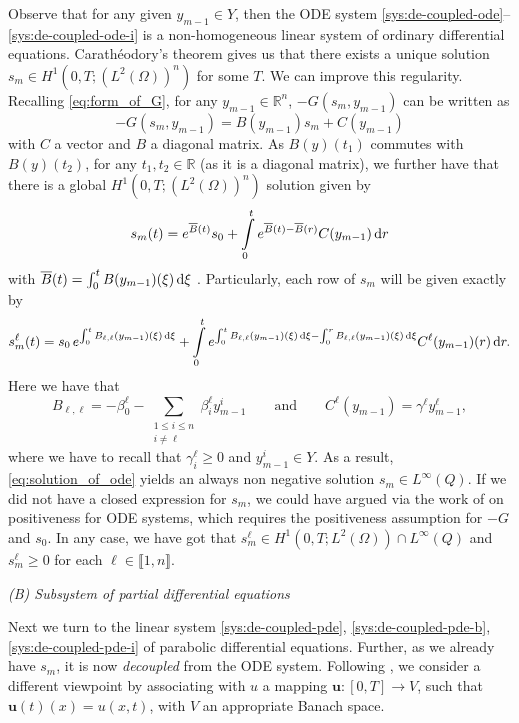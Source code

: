 \documentclass[11pt]{article}
\newcommand{\R}{\mathbb{R}}
\newcommand{\llb}{\llbracket}
\newcommand{\rrb}{\rrbracket}
\begin{document}
Observe that for any given \(y_{m-1} \in Y \), then the ODE system \eqref{sys:de-coupled-ode}--\eqref{sys:de-coupled-ode-i} is a non-homogeneous linear system of ordinary differential equations.
%
Carathéodory's theorem gives us that there exists a unique solution \(s_m \in H^{1} ( 0,T;(L^2(\Omega))^{n}  )\) for some \(T\).
	We can improve this regularity. Recalling \eqref{eq:form_of_G}, for any \(y_{m-1} \in \R^n\), \(-G(s_m,y_{m-1})\) can be written as
	\[
		-G(s_m,y_{m-1}) = B(y_{m-1})s_m + C(y_{m-1})
	\]
	with \(C\) a vector and \(B\) a diagonal matrix. As \(B(y)(t_1)\) commutes with \( B(y)(t_2)\), for any \(t_1, t_2 \in \R\) (as it is a diagonal matrix), we further have that there is a global \(H^1 (0,T;(L^2(\Omega))^n )\) solution given by
	\[
		s_m(t) = e^{\overline{B}(t)} s_0 + \int\limits_0^t e^{\overline{B}(t)- \overline{B}(r)} C(y_{m-1}) \dif r
	\]
	with \( \overline{B}(t) = \int_0^t B(y_{m-1})(\xi) \dif \xi\) \cite{Schaeffer-2016}. 
	Particularly, each row of \(s_m\) will be given exactly by
	\begin{equation}
	\label{eq:solution_of_ode}
		s_m^\ell (t) = s_0 \, e^{ \int_0^t B_{\ell,\ell} (y_{m-1})(\xi) \dif \xi } + \int\limits_0^t 
		e^{ \int_0^t B_{\ell,\ell} (y_{m-1})(\xi) \dif \xi - \int_0^r  B_{\ell,\ell} (y_{m-1})(\xi) \dif \xi} 
		C^{\ell} (y_{m-1})(r) \dif r.
	\end{equation}
	Here we have that
	\[
		B_{\ell,\ell} = -\beta_0^\ell - \sum_{\substack{1\le i\le n\\ i\neq \ell}} \beta_i^\ell y_{m-1}^i 
		\qquad\text{and}\qquad
		C^\ell (y_{m-1}) = \gamma^\ell y_{m-1}^\ell,
	\]
	where we have to recall that \( \gamma_i^\ell \geq 0\) and \( y_{m-1}^i \in Y\). As a result, \eqref{eq:solution_of_ode} yields an always non negative solution \( s_m \in L^\infty (Q)\).
	If we did not have a closed expression for \(s_m\), we could have argued via the work of \cite{Horvath-1998} on positiveness for ODE systems, which requires the positiveness assumption for \(-G\) and \(s_0\). In any case, we have got that \( s_m^\ell \in H^1(0,T;L^2(\Omega) ) \cap L^\infty (Q)\) and \(s_m^\ell \geq 0\) for each \(\ell\in \llb 1,n\rrb\).



\vspace{1\baselineskip}
\noindent\emph{(B) Subsystem of partial differential equations}
\vspace{0.5\baselineskip}


Next we turn to the linear system \eqref{sys:de-coupled-pde}, \eqref{sys:de-coupled-pde-b}, \eqref{sys:de-coupled-pde-i} of parabolic differential equations. Further, as we already have \(s_m\), it is now \emph{decoupled} from the ODE system. Following \cite{Evans-2010}, we consider a different viewpoint by associating with \(u\) a mapping \( \mathbf{u} : [0,T] \to V\), such that \( \mathbf{u}(t)(x) = u(x,t)\), with \(V\) an appropriate Banach space. 
\end{document}
